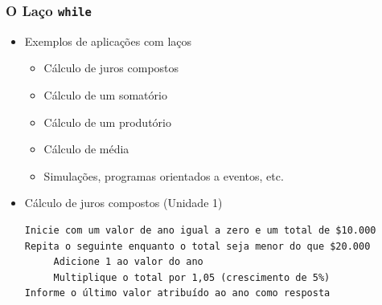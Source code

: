 \documentclass[xcolor={dvipsnames,table},aspectratio=169]{beamer}
\begin{document}
\begin{frame}[fragile]\frametitle{O Laço \texttt{while}}
\begin{itemize}
	\item Exemplos de aplicações com laços
	\begin{itemize}
		\item Cálculo de juros compostos
		\item Cálculo de um somatório
		\item Cálculo de um produtório
		\item Cálculo de média
		\item Simulações, programas orientados a eventos, etc.
	\end{itemize}
	\item Cálculo de juros compostos (Unidade 1)
\begin{verbatim}
Inicie com um valor de ano igual a zero e um total de $10.000
Repita o seguinte enquanto o total seja menor do que $20.000
     Adicione 1 ao valor do ano
     Multiplique o total por 1,05 (crescimento de 5%)
Informe o último valor atribuído ao ano como resposta
\end{verbatim}
\end{itemize}
\end{frame}
\end{document}
